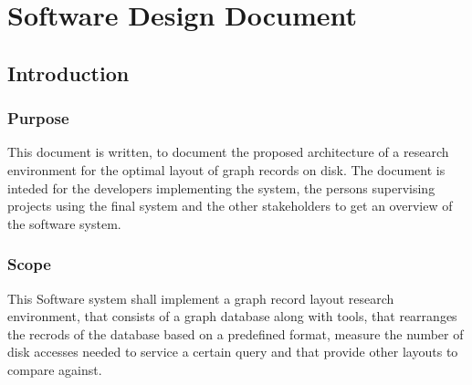 \section{Software Design Document}

	\subsection{Introduction}
		\subsubsection{Purpose}
			This document is written, to document the proposed architecture of a research environment for the optimal layout of graph records on disk. The document is inteded for the developers implementing the system, the persons supervising projects using the final system and the other stakeholders to get an overview of the software system.
			
		\subsubsection{Scope}
			This Software system shall implement a graph record layout research environment, that consists of a graph database along with tools, that rearranges the recrods of the database based on a predefined format, measure the number of disk accesses needed to service a certain query and that provide other layouts to compare against.
		
		
